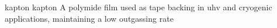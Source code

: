 \newglsXterm%
{kapton}%
{kapton}%
{A polymide film used as tape backing in \gls{uhv} and cryogenic applications, maintaining a low outgassing rate}%